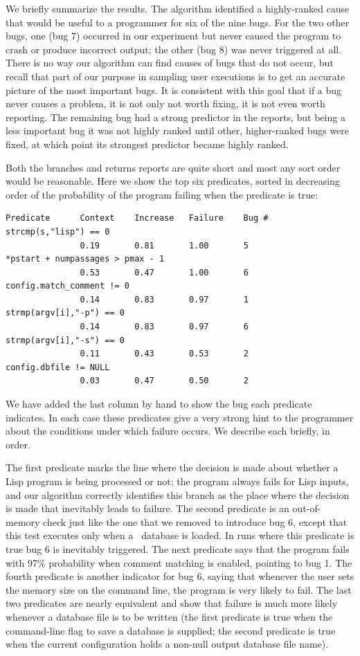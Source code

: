 We briefly summarize the results.
The algorithm identified a highly-ranked cause that would be useful to a programmer
for six of the nine bugs.  For the two other bugs,
one (bug 7) occurred in our experiment but never caused
the program to crash or produce incorrect output; the other (bug 8) was never
triggered at all.  There is no way our algorithm can find causes of bugs that do not
occur, but recall that part of our purpose in sampling user executions
is to get an accurate picture of the most important bugs. It is consistent with
this goal that if a bug never causes a problem, it is not only not worth fixing,
it is not even worth reporting.  The remaining bug had a strong predictor in the reports,
but being a less important bug it was not highly ranked until other, higher-ranked
bugs were fixed, at which point its strongest predictor became highly ranked.

Both the branches and returns reports are quite short and most any sort order would be
reasonable.  Here we show the top six predicates, sorted in decreasing order of the probability
of the program failing when the predicate is true:
\begin{verbatim}
Predicate      Context    Increase   Failure    Bug #
strcmp(s,"lisp") == 0  
               0.19       0.81       1.00       5
*pstart + numpassages > pmax - 1 
               0.53       0.47       1.00       6
config.match_comment != 0
               0.14       0.83       0.97       1
strmp(argv[i],"-p") == 0
               0.14       0.83       0.97       6
strmp(argv[i],"-s") == 0
               0.11       0.43       0.53       2
config.dbfile != NULL
               0.03       0.47       0.50       2
\end{verbatim}
We have added the last column by hand to show the bug each predicate indicates.  In
each case these predicates give a very strong hint to the programmer about the conditions
under which failure occurs.  We describe each briefly, in order.


The first predicate marks the line where the decision is made about
whether a Lisp program is being processed or not; the program always
fails for Lisp inputs, and our algorithm correctly identifies this
branch as the place where the decision is made that inevitably leads
to failure.  The second predicate is an out-of-memory check just like
the one that we removed to introduce bug 6, except that this test executes
only when a \moss\ database is loaded.  In runs where this predicate
is true bug 6 is inevitably triggered.  The next predicate says that
the program fails with 97\% probability when comment matching is
enabled, pointing to bug 1.  The fourth predicate is another indicator for
bug 6, saying that whenever the user sets the memory size on the command line,
the program is very likely to fail.  The last two predicates are nearly 
equivalent and show that failure is much more likely whenever a
database file is to be written (the first predicate is true when the
command-line flag to save a database is supplied; the second predicate
is true when the current configuration holds a non-null output
database file name).


